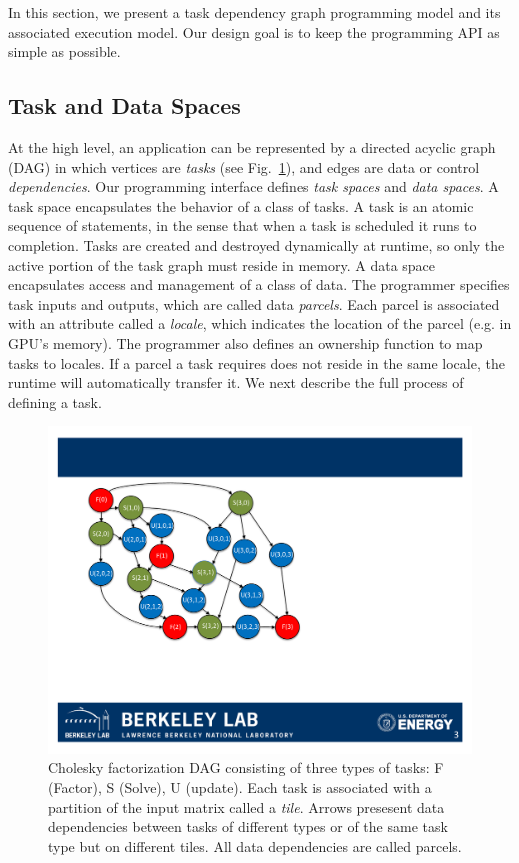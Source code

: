 In this section, we present a task dependency graph programming model and its associated execution model.
Our design goal is to keep the programming API as simple as possible.


\subsection{Task and Data Spaces}
At the high level, an application can be represented by a directed acyclic graph (DAG) in which vertices are {\em tasks} (see Fig.~\ref{fig:cholesky}),
and edges are data or control {\em dependencies}.
Our programming interface defines {\em task spaces} and {\em data spaces}.
A task space encapsulates the behavior of a class of tasks.
A task is an atomic sequence of statements, in the sense that when a task is scheduled it runs to completion.
Tasks are created and destroyed dynamically at runtime, so only the active portion of the task graph must reside in memory.
A data space encapsulates access and management of a class of data.
The programmer specifies task inputs and outputs, which are called data {\em parcels}.
Each parcel is associated with an attribute called a {\em locale}, which indicates the location of the parcel (e.g. in GPU's memory).
The programmer also defines an ownership function to map tasks to locales.
If a parcel a task requires does not reside in the same locale, the runtime will automatically transfer it.
We next describe the full process of defining a task.

\begin{figure}[htb]
\centering
\includegraphics[width=.4\textwidth]{figures/cholesky.pdf}
\caption{Cholesky factorization DAG consisting of three types of tasks: F (Factor), S (Solve), U (update). Each task is associated with a partition of the input matrix called a {\em tile}. Arrows presesent data dependencies between tasks of different types or of the same task type but on different tiles. All data dependencies are called parcels.}
\label{fig:cholesky}
\end{figure}



